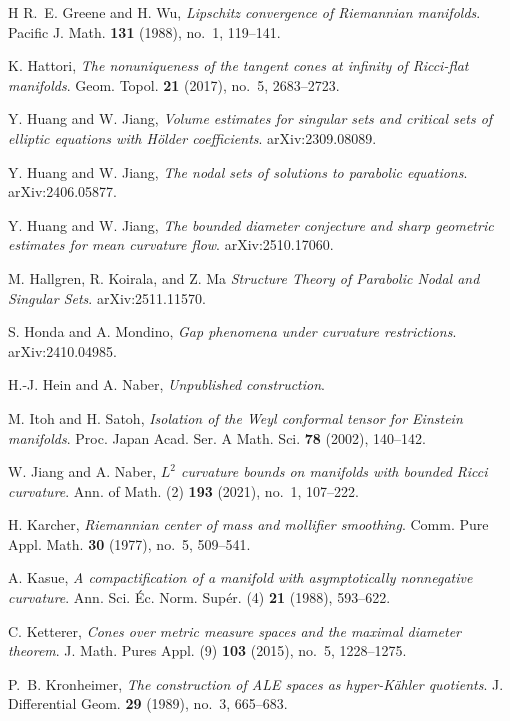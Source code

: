 \documentclass[11pt,reqno]{amsart}
\numberwithin{equation}{section}
\theoremstyle{definition}
\theoremstyle{remark}
\begin{document}
\begin{thebibliography}{H}
R.~E. Greene and H. Wu,
\textit{Lipschitz convergence of Riemannian manifolds}.
Pacific J. Math. \textbf{131} (1988), no.~1, 119--141.

K. Hattori,
\textit{The nonuniqueness of the tangent cones at infinity of Ricci-flat manifolds}.
Geom. Topol. \textbf{21} (2017), no.~5, 2683--2723.

Y. Huang and W. Jiang,
\textit{Volume estimates for singular sets and critical sets of elliptic equations with Hölder coefficients}.
arXiv:2309.08089.

Y. Huang and W. Jiang,
\textit{The nodal sets of solutions to parabolic equations}.
arXiv:2406.05877.

Y. Huang and W. Jiang,
\textit{The bounded diameter conjecture and sharp geometric estimates for mean curvature flow}.
arXiv:2510.17060.

M. Hallgren, R. Koirala, and Z. Ma
\textit{Structure Theory of Parabolic Nodal and Singular Sets}. arXiv:2511.11570.

S. Honda and A. Mondino,
\textit{Gap phenomena under curvature restrictions}.
arXiv:2410.04985.

H.-J. Hein and A. Naber,
\textit{Unpublished construction}.

M. Itoh and H. Satoh,
\textit{Isolation of the Weyl conformal tensor for Einstein manifolds}.
Proc. Japan Acad. Ser. A Math. Sci. \textbf{78} (2002), 140--142.

W. Jiang and A. Naber,
{\textit{$L^2$ curvature bounds on manifolds with bounded Ricci curvature}}.
Ann. of Math. (2) \textbf{193} (2021), no.~1, 107--222.

H. Karcher,
\textit{Riemannian center of mass and mollifier smoothing}.
Comm. Pure Appl. Math. \textbf{30} (1977), no.~5, 509--541.

A. Kasue,
\textit{A compactification of a manifold with asymptotically nonnegative curvature}.
Ann. Sci. Éc. Norm. Supér. (4) \textbf{21} (1988), 593--622.

C. Ketterer,
\textit{Cones over metric measure spaces and the maximal diameter theorem}.
J. Math. Pures Appl. (9) \textbf{103} (2015), no.~5, 1228--1275.

P.~B. Kronheimer,
{\textit{The construction of ALE spaces as hyper-Kähler quotients}}.
J. Differential Geom. \textbf{29} (1989), no.~3, 665--683.


\end{thebibliography}
\end{document}
